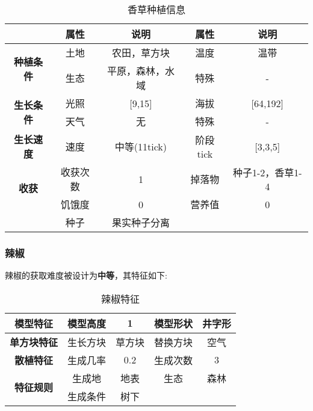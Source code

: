 \begin{table}[H]
    \centering
    \caption{香草种植信息}
    \label{table:香草种植信息}
    \setlength{\tabcolsep}{4mm}
    \begin{tabular}{c|cc|cc}
        \toprule
                                           & \textbf{属性} & \textbf{说明}    & \textbf{属性} & \textbf{说明}    \\
        \midrule
        \multirow{2}{*}{\textbf{种植条件}} & 土地          & 农田，草方块     & 温度          & 温带             \\
                                           & 生态          & 平原，森林，水域 & 特殊          & -                \\
        \midrule
        \multirow{2}{*}{\textbf{生长条件}} & 光照          & [9,15]           & 海拔          & [64,192]         \\
                                           & 天气          & 无               & 特殊          & -                \\
        \midrule
        \textbf{生长速度}                  & 速度          & 中等(11tick)     & 阶段tick      & [3,3,5]          \\
        \midrule
        \multirow{2}{*}{\textbf{收获}}     & 收获次数      & 1                & 掉落物        & 种子1-2，香草1-4 \\
                                           & 饥饿度        & 0                & 营养值        & 0                \\
                                           & 种子 & 果实种子分离 \\
        \bottomrule
    \end{tabular}
\end{table}

\subsubsection{辣椒}

辣椒的获取难度被设计为\textbf{中等}，其特征如下:
\begin{table}[H]
    \centering
    \caption{辣椒特征}
    \label{table:辣椒特征}
    \setlength{\tabcolsep}{4mm}
    \begin{tabular}{c|cc|cc}
        \toprule
        \textbf{模型特征}                  & 模型高度 & 1      & 模型形状 & 井字形 \\
        \midrule
        \textbf{单方块特征}                & 生长方块 & 草方块 & 替换方块 & 空气   \\
        \midrule
        \textbf{散植特征}                  & 生成几率 & 0.2    & 生成次数 & 3      \\
        \midrule
        \multirow{2}{*}{\textbf{特征规则}} & 生成地   & 地表   & 生态     & 森林   \\
                                           & 生成条件 & 树下                       \\
        \bottomrule
    \end{tabular}
\end{table}


